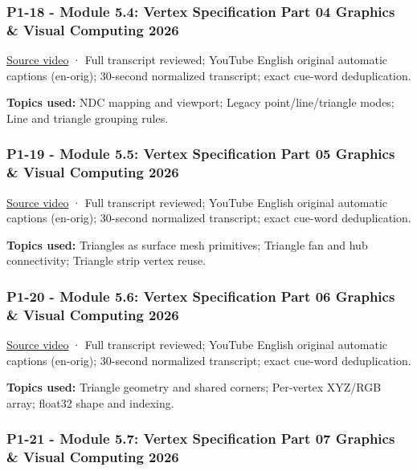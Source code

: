 \subsubsection{P1-18 - Module 5.4: Vertex Specification Part 04 Graphics \& Visual Computing 2026}\label{04-visual-computing-ii-ch036-p1-18---module-5.4-vertex-specification-part-04-graphics-visual-computing-2026}

\href{https://www.youtube.com/watch?v=yNa86goEb64}{Source video} · Full transcript reviewed; YouTube English original automatic captions (en-orig); 30-second normalized transcript; exact cue-word deduplication.

\textbf{Topics used:} NDC mapping and viewport; Legacy point/line/triangle modes; Line and triangle grouping rules.

\subsubsection{P1-19 - Module 5.5: Vertex Specification Part 05 Graphics \& Visual Computing 2026}\label{04-visual-computing-ii-ch036-p1-19---module-5.5-vertex-specification-part-05-graphics-visual-computing-2026}

\href{https://www.youtube.com/watch?v=IaV0iweZLxY}{Source video} · Full transcript reviewed; YouTube English original automatic captions (en-orig); 30-second normalized transcript; exact cue-word deduplication.

\textbf{Topics used:} Triangles as surface mesh primitives; Triangle fan and hub connectivity; Triangle strip vertex reuse.

\subsubsection{P1-20 - Module 5.6: Vertex Specification Part 06 Graphics \& Visual Computing 2026}\label{04-visual-computing-ii-ch036-p1-20---module-5.6-vertex-specification-part-06-graphics-visual-computing-2026}

\href{https://www.youtube.com/watch?v=S8gMtV0Zsa4}{Source video} · Full transcript reviewed; YouTube English original automatic captions (en-orig); 30-second normalized transcript; exact cue-word deduplication.

\textbf{Topics used:} Triangle geometry and shared corners; Per-vertex XYZ/RGB array; float32 shape and indexing.

\subsubsection{P1-21 - Module 5.7: Vertex Specification Part 07 Graphics \& Visual Computing 2026}\label{04-visual-computing-ii-ch036-p1-21---module-5.7-vertex-specification-part-07-graphics-visual-computing-2026}

